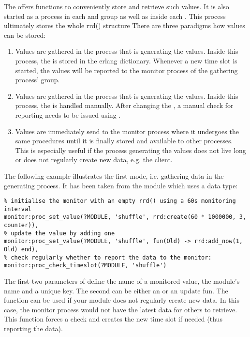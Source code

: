 The  offers functions to conveniently store and retrieve
such values. It is also started as a process in each  and
 group as well as inside each .
This process ultimately stores the whole rrd() structure
There are three paradigms how values can be stored:
\begin{enumerate}
  \item Values are gathered in the process that is generating the values.
        Inside this process, the  is stored in the erlang
        dictionary.
        Whenever a new time slot is started, the values will be
        reported to the monitor process of the gathering process' group.
  \item Values are gathered in the process that is generating the values.
        Inside this process, the  is handled manually.
        After changing the , a manual check for reporting needs to
        be issued using .
  \item Values are immediately send to the monitor process where it undergoes
        the same procedures until it is finally stored and available to other
        processes. This is especially useful if the process generating the
        values does not live long or does not regularly create new data, e.g.
        the client.
\end{enumerate}

The following example illustrates the first mode, i.e. gathering data in the
generating process. It has been taken from the  module which
uses a  data type:

\begin{lstlisting}
% initialise the monitor with an empty rrd() using a 60s monitoring interval
monitor:proc_set_value(?MODULE, 'shuffle', rrd:create(60 * 1000000, 3, counter)),
% update the value by adding one
monitor:proc_set_value(?MODULE, 'shuffle', fun(Old) -> rrd:add_now(1, Old) end),
% check regularly whether to report the data to the monitor:
monitor:proc_check_timeslot(?MODULE, 'shuffle')
\end{lstlisting}

The first two parameters of  define the
name of a monitored value, the module's name and a unique key. The second can
be either an  or an update fun.
The  function can be used if your
module does not regularly create new data. In this case, the monitor process
would not have the latest data for others to retrieve. This function forces a
check and creates the new time slot if needed (thus reporting the data).


